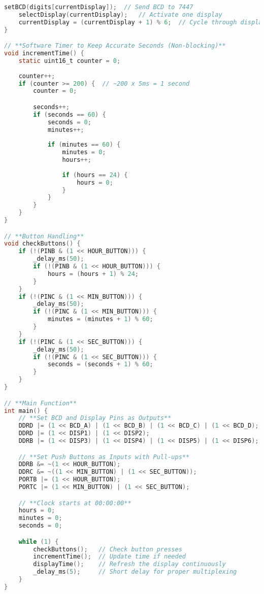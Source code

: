 \documentclass[a4paper,12pt]{article}
\theoremstyle{remark}
\begin{document}
\begin{lstlisting}[language=C, basicstyle=\ttfamily, keywordstyle=\color{blue}, commentstyle=\color{gray}]
    setBCD(digits[currentDisplay]);  // Send BCD to 7447
    selectDisplay(currentDisplay);   // Activate one display
    currentDisplay = (currentDisplay + 1) % 6;  // Cycle through displays
}

// **Software Timer to Keep Accurate Seconds (Non-blocking)**
void incrementTime() {
    static uint16_t counter = 0;
    
    counter++;
    if (counter >= 200) {  // ~200 x 5ms = 1 second
        counter = 0;

        seconds++;
        if (seconds == 60) {  
            seconds = 0;  
            minutes++;
            
            if (minutes == 60) {  
                minutes = 0;
                hours++;
                
                if (hours == 24) {  
                    hours = 0;  
                }
            }
        }
    }
}

// **Button Handling**
void checkButtons() {
    if (!(PINB & (1 << HOUR_BUTTON))) {
        _delay_ms(50);
        if (!(PINB & (1 << HOUR_BUTTON))) {
            hours = (hours + 1) % 24;
        }
    }
    if (!(PINC & (1 << MIN_BUTTON))) {
        _delay_ms(50);
        if (!(PINC & (1 << MIN_BUTTON))) {
            minutes = (minutes + 1) % 60;
        }
    }
    if (!(PINC & (1 << SEC_BUTTON))) {
        _delay_ms(50);
        if (!(PINC & (1 << SEC_BUTTON))) {
            seconds = (seconds + 1) % 60;
        }
    }
}

// **Main Function**
int main() {
    // **Set BCD and Display Pins as Outputs**
    DDRD |= (1 << BCD_A) | (1 << BCD_B) | (1 << BCD_C) | (1 << BCD_D);
    DDRD |= (1 << DISP1) | (1 << DISP2);
    DDRB |= (1 << DISP3) | (1 << DISP4) | (1 << DISP5) | (1 << DISP6);

    // **Set Push Buttons as Inputs with Pull-ups**
    DDRB &= ~(1 << HOUR_BUTTON);
    DDRC &= ~((1 << MIN_BUTTON) | (1 << SEC_BUTTON));
    PORTB |= (1 << HOUR_BUTTON);
    PORTC |= (1 << MIN_BUTTON) | (1 << SEC_BUTTON);

    // **Clock starts at 00:00:00**
    hours = 0;
    minutes = 0;
    seconds = 0;

    while (1) {
        checkButtons();   // Check button presses
        incrementTime();  // Update time if needed
        displayTime();    // Refresh the display continuously
        _delay_ms(5);     // Short delay for proper multiplexing
    }
}
\end{lstlisting}
\end{document}
